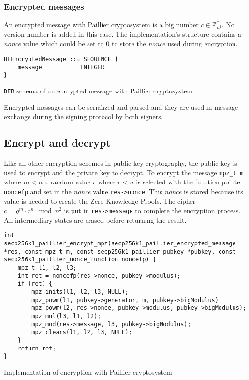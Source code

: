 \subsubsection{Encrypted messages}

An encrypted message with Paillier cryptosystem is a big number $c \in
\mathbb{Z}_{n^2}^*$. No version number is added in this case. The implementation's
structure contains a \textit{nonce} value which could be set to 0 to store the \textit{nonce} used
during encryption.

\begin{listing}
  \begin{verbatim}
HEEncryptedMessage ::= SEQUENCE {
    message           INTEGER
}
  \end{verbatim}
	\caption{\texttt{DER} schema of an encrypted message with Paillier cryptosystem}
	\label{lst:DERSchemaPaillierEncMessage}
\end{listing}

Encrypted messages can be serialized and parsed and they are used in message
exchange during the signing protocol by both signers.

\subsection{Encrypt and decrypt}

Like all other encryption schemes in public key cryptography, the public key is
used to encrypt and the private key to decrypt. To encrypt the message
\texttt{mpz\_t m} where $m < n$ a random value $r$ where $r < n$ is selected
with the function pointer \texttt{noncefp} and set in the \textit{nonce} value
\texttt{res->nonce}. This \textit{nonce} is stored because its value is needed to create the
Zero-Knowledge Proofs. The cipher $c = g^m \cdot r^n \mod n^2$ is put
in \texttt{res->message} to complete the encryption process. All intermediary
states are erased before returning the result.

\begin{listing}
  \begin{verbatim}
int secp256k1_paillier_encrypt_mpz(secp256k1_paillier_encrypted_message *res, const mpz_t m, const secp256k1_paillier_pubkey *pubkey, const secp256k1_paillier_nonce_function noncefp) {
    mpz_t l1, l2, l3;
    int ret = noncefp(res->nonce, pubkey->modulus);
    if (ret) {
        mpz_inits(l1, l2, l3, NULL);
        mpz_powm(l1, pubkey->generator, m, pubkey->bigModulus);
        mpz_powm(l2, res->nonce, pubkey->modulus, pubkey->bigModulus);
        mpz_mul(l3, l1, l2);
        mpz_mod(res->message, l3, pubkey->bigModulus);
        mpz_clears(l1, l2, l3, NULL);
    }
    return ret;
}
  \end{verbatim}
	\caption{Implementation of encryption with Paillier cryptosystem}
	\label{lst:implEncryptPaillier}
\end{listing}

